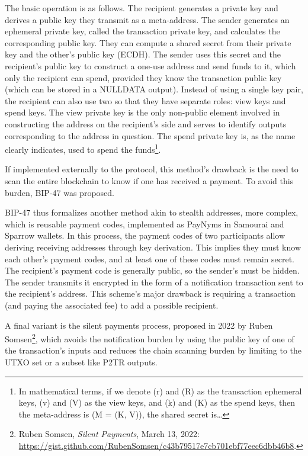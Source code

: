 \documentclass[
  a5paper,
  smalldemyvopaper,10pt,twoside,onecolumn,openright,extrafontsizes,hidelinks]{memoir}
\begin{document}
The basic operation is as follows. The recipient generates a private key
and derives a public key they transmit as a meta-address. The sender
generates an ephemeral private key, called the transaction private key,
and calculates the corresponding public key. They can compute a shared
secret from their private key and the other's public key (ECDH). The
sender uses this secret and the recipient's public key to construct a
one-use address and send funds to it, which only the recipient can
spend, provided they know the transaction public key (which can be
stored in a NULLDATA output). Instead of using a single key pair, the
recipient can also use two so that they have separate roles: view keys
and spend keys. The view private key is the only non-public element
involved in constructing the address on the recipient's side and serves
to identify outputs corresponding to the address in question. The spend
private key is, as the name clearly indicates, used to spend the
funds\footnote{In mathematical terms, if we denote (r) and (R) as the
  transaction ephemeral keys, (v) and (V) as the view keys, and (k) and
  (K) as the spend keys, then the meta-address is (M = (K, V)), the
  shared secret is\ldots{}}.

If implemented externally to the protocol, this method's drawback is the
need to scan the entire blockchain to know if one has received a
payment. To avoid this burden, BIP-47 was proposed.

BIP-47 thus formalizes another method akin to stealth addresses, more
complex, which is reusable payment codes, implemented as PayNyms in
Samourai and Sparrow wallets. In this process, the payment codes of two
participants allow deriving receiving addresses through key derivation.
This implies they must know each other's payment codes, and at least one
of these codes must remain secret. The recipient's payment code is
generally public, so the sender's must be hidden. The sender transmits
it encrypted in the form of a notification transaction sent to the
recipient's address. This scheme's major drawback is requiring a
transaction (and paying the associated fee) to add a possible recipient.

A final variant is the silent payments process, proposed in 2022 by
Ruben Somsen\footnote{Ruben Somsen, \emph{Silent Payments}, March 13,
  2022:
  \url{https://gist.github.com/RubenSomsen/c43b79517e7cb701ebf77eec6dbb46b8}.},
which avoids the notification burden by using the public key of one of
the transaction's inputs and reduces the chain scanning burden by
limiting to the UTXO set or a subset like P2TR outputs.
\end{document}
